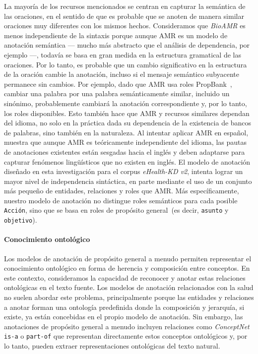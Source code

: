 La mayoría de los recursos mencionados se centran en capturar la semántica de las oraciones, en el sentido de que es probable que se anoten de manera similar oraciones muy diferentes con los mismos hechos. Consideramos que \textit{BioAMR} es menos independiente de la sintaxis porque aunque AMR es un modelo de anotación semántica --- mucho más abstracto que el análisis de dependencia, por ejemplo ---, todavía se basa en gran medida en la estructura gramatical de las oraciones. Por lo tanto, es probable que un cambio significativo en la estructura de la oración cambie la anotación, incluso si el mensaje semántico subyacente permanece sin cambios. Por ejemplo, dado que AMR usa roles PropBank~\cite{propbank}, cambiar una palabra por una palabra semánticamente similar, incluido un sinónimo, probablemente cambiará la anotación correspondiente y, por lo tanto, los roles disponibles.
Esto también hace que AMR y recursos similares dependan del idioma, no solo en la práctica dada su dependencia de la existencia de bancos de palabras, sino también en la naturaleza. Al intentar aplicar AMR en español, \citet{migueles2018annotating} muestra que aunque AMR es teóricamente independiente del idioma, las pautas de anotaciones existentes están sesgadas hacia el inglés y deben adaptarse para capturar fenómenos lingüísticos que no existen en inglés.
El modelo de anotación diseñado en esta investigación para el corpus \textit{eHealth-KD v2}, intenta lograr un mayor nivel de independencia sintáctica, en parte mediante el uso de un conjunto más pequeño de entidades, relaciones y roles que AMR. Más específicamente, nuestro modelo de anotación no distingue roles semánticos para cada posible \texttt{Acción}, sino que se basa en roles de propósito general~(es decir, \texttt{asunto} y \texttt{objetivo}).

\paragraph{Conocimiento ontológico}
Los modelos de anotación de propósito general a menudo permiten representar el conocimiento ontológico en forma de herencia y composición entre conceptos. En este contexto, consideramos la capacidad de reconocer y anotar estas relaciones ontológicas en el texto fuente. Los modelos de anotación relacionados con la salud no suelen abordar este problema, principalmente porque las entidades y relaciones a anotar forman una ontología predefinida donde la composición y jerarquía, si existe, ya están concebidas en el propio modelo de anotación. Sin embargo, las anotaciones de propósito general a menudo incluyen relaciones como \textit{ConceptNet} \texttt{is-a} o \texttt{part-of} que representan directamente estos conceptos ontológicos y, por lo tanto, pueden extraer representaciones ontológicas del texto natural.

